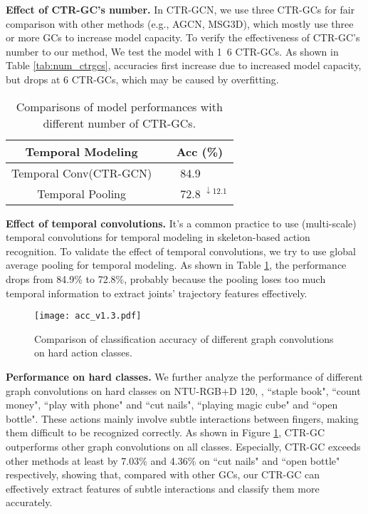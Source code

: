\documentclass[10pt,twocolumn,letterpaper]{article}
\begin{document}
\noindent \textbf{Effect of CTR-GC's number.} In CTR-GCN, we use three CTR-GCs for fair comparison with other methods (e.g., AGCN, MSG3D), which mostly use three or more GCs to increase model capacity. To verify the effectiveness of CTR-GC's number to our method, We test the model with 1~6 CTR-GCs. As shown in Table \ref{tab:num_ctrgcs}, accuracies first increase due to increased model capacity, but drops at 6 CTR-GCs, which may be caused by overfitting.

\begin{table}
	\begin{center}
		\begin{tabular}{c l}
			\hline
			\textbf{Temporal Modeling} & \ \ \textbf{Acc (\%)} \\
			\hline\hline
			Temporal Conv(CTR-GCN) & \ \ \ 84.9 \\
			\hline
			Temporal Pooling & \ \ \ 72.8 $^{\downarrow 12.1}$\\
			\hline
		\end{tabular}
	\end{center}
	\caption{Comparisons of model performances with different number of CTR-GCs.}
	\label{tab:temp_conv}
\end{table}

\noindent \textbf{Effect of temporal convolutions.} It's a common practice to use (multi-scale) temporal convolutions for temporal modeling in skeleton-based action recognition. To validate the effect of temporal convolutions, we try to use global average pooling for temporal modeling. As shown in Table \ref{tab:temp_conv}, the performance drops from 84.9\% to 72.8\%, probably because the pooling loses too much temporal information to extract joints' trajectory features effectively.

\begin{figure}[t]
	\centering
	\texttt{[image: acc\_v1.3.pdf]} \caption{Comparison of classification accuracy of different graph convolutions on hard action classes.} 
	\vspace{-0.3cm}
	\label{fig:acc}
\end{figure}

\noindent \textbf{Performance on hard classes.} We further analyze the performance of different graph convolutions on hard classes on NTU-RGB+D 120, \ie, ``staple book", ``count money", ``play with phone" and ``cut nails", ``playing magic cube" and ``open bottle". These actions mainly involve subtle interactions between fingers, making them difficult to be recognized correctly. As shown in Figure \ref{fig:acc}, CTR-GC outperforms other graph convolutions on all classes. Especially, CTR-GC exceeds other methods at least by 7.03\% and 4.36\% on ``cut nails" and ``open bottle" respectively, showing that, compared with other GCs, our CTR-GC can effectively extract features of subtle interactions and classify them more accurately.
\end{document}
